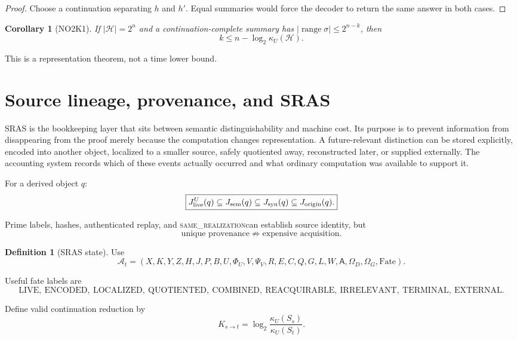 \documentclass[11pt]{article}
\newcommand{\same}{\textsc{same\_realization}}
\theoremstyle{plain}
\newtheorem{corollary}[theorem]{Corollary}
\theoremstyle{definition}
\newtheorem{definition}[theorem]{Definition}
\theoremstyle{remark}
\begin{document}
\begin{proof}
Choose a continuation separating $h$ and $h'$. Equal summaries would force
the decoder to return the same answer in both cases.
\end{proof}

\begin{corollary}[NO2K1]
If $|\mathcal H|=2^n$ and a continuation-complete summary has
$|\operatorname{range}\sigma|\le2^{n-k}$, then
\[
\boxed{k\le n-\log_2\kappa_U(\mathcal H).}
\]
\end{corollary}

\begin{warningbox}
This is a representation theorem, not a time lower bound.
\end{warningbox}

\section{Source lineage, provenance, and SRAS}

SRAS is the bookkeeping layer that sits between semantic distinguishability
and machine cost. Its purpose is to prevent information from disappearing
from the proof merely because the computation changes representation. A
future-relevant distinction can be stored explicitly, encoded into another
object, localized to a smaller source, safely quotiented away, reconstructed
later, or supplied externally. The accounting system records which of these
events actually occurred and what ordinary computation was available to
support it.

For a derived object $q$:
\[
\boxed{
J_{\rm live}^{U}(q)
\subseteq J_{\rm sem}(q)
\subseteq J_{\rm syn}(q)
\subseteq J_{\rm origin}(q).
}
\]

Prime labels, hashes, authenticated replay, and \same can establish source
identity, but
\[
\boxed{\text{unique provenance}\not\Rightarrow\text{expensive acquisition}.}
\]

\begin{definition}[SRAS state]
Use
\[
\mathcal A_t=
(X,K,Y,Z,H,J,P,B,U,\Phi_U,V,\Psi_V,R,E,C,Q,G,L,W,\mathsf A,
\Omega_D,\Omega_G,\mathrm{Fate}).
\]
\end{definition}

Useful fate labels are
\[
\mathrm{LIVE},\ \mathrm{ENCODED},\ \mathrm{LOCALIZED},\
\mathrm{QUOTIENTED},\ \mathrm{COMBINED},\
\mathrm{REACQUIRABLE},\ \mathrm{IRRELEVANT},\ \mathrm{TERMINAL},\ \mathrm{EXTERNAL}.
\]

Define valid continuation reduction by
\[
\boxed{
K_{s\to t}
=
\log_2\frac{\kappa_U(S_s)}{\kappa_U(S_t)}.
}
\]
\end{document}
